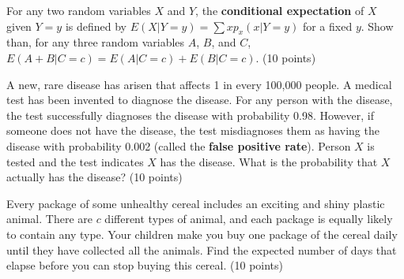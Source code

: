 \documentclass[fleqn]{homework}
\begin{document}
  \begin{problem}{3}
    \begin{question}
      For any two random variables $X$ and $Y$, the \textbf{conditional
        expectation} of $X$ given $Y=y$ is defined by
      $E(X|Y=y) = \sum x p_x(x|Y=y)$ for a fixed $y$.  Show than, for any three
      random variables $A$, $B$, and $C$, $E(A+B|C=c) = E(A|C=c) +
      E(B|C=c)$. (10 points)
    \end{question}
  \end{problem}

  \begin{problem}{4}
    \begin{question}
      A new, rare disease has arisen that affects 1 in every 100,000 people.  A
      medical test has been invented to diagnose the disease.  For any person
      with the disease, the test successfully diagnoses the disease with
      probability 0.98.  However, if someone does not have the disease, the test
      misdiagnoses them as having the disease with probability 0.002 (called the
      \textbf{false positive rate}).  Person $X$ is tested and the test
      indicates $X$ has the disease.  What is the probability that $X$ actually
      has the disease? (10 points)
    \end{question}
  \end{problem}

  \begin{problem}{5}
    \begin{question}
      Every package of some unhealthy cereal includes an exciting and shiny
      plastic animal.  There are $c$ different types of animal, and each package
      is equally likely to contain any type.  Your children make you buy one
      package of the cereal daily until they have collected all the animals.
      Find the expected number of days that elapse before you can stop buying
      this cereal. (10 points)
    \end{question}
  \end{problem}
\end{document}
